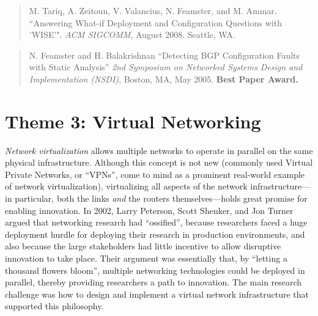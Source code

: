 \begin{quote}
M. Tariq, A. Zeitoun, V. Valancius, N. Feamster, and
M. Ammar. ``Answering What-if Deployment and Configuration Questions with
'WISE'". {\em ACM SIGCOMM}, August 2008. Seattle, WA.
\end{quote}

\newpage
{}
\begin{quote}
N. Feamster and H. Balakrishnan ``Detecting BGP Configuration Faults
with Static Analysis'' {\em 2nd Symposium on Networked Systems Design
and Implementation (NSDI)}, Boston, MA, May 2005. {\bf Best Paper Award.}
\end{quote}

\section*{Theme 3: Virtual Networking}

{\em Network virtualization} allows multiple networks to operate in
parallel on the same physical infrastructure.  Although this concept is
not new (commonly used Virtual Private Networks, or ``VPNs'', come to
mind as a prominent real-world example of network virtualization),
virtualizing all aspects of the network infrastructure---in particular,
both the links {\em and} the routers themselves---holds great promise
for enabling innovation.  In 2002, Larry Peterson, Scott Shenker, and
Jon Turner argued that networking research had ``ossified'', because
researchers faced a huge deployment hurdle for deploying their research
in production environments, and also because the large stakeholders had
little incentive to allow disruptive innovation to take place.  Their
argument was essentially that, by ``letting a thousand flowers bloom'',
multiple networking technologies could be deployed in parallel, thereby
providing researchers a path to innovation.  The main research challenge
was how to design and implement a virtual network infrastructure that
supported this philosophy.  

